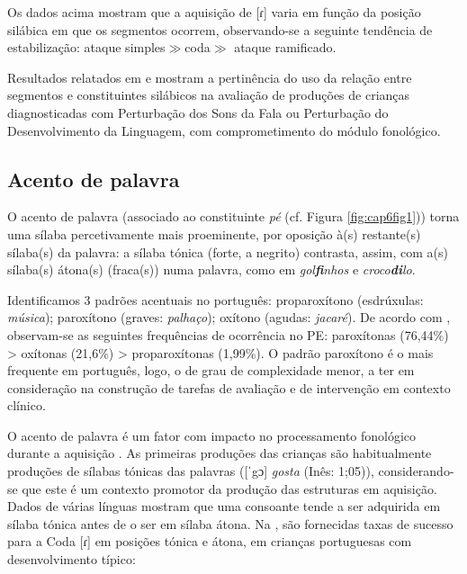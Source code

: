 \documentclass[output=paper,colorlinks,citecolor=brown,booklanguage=portuguese]{langscibook}
\begin{document}
Os dados acima mostram que a aquisição de [ɾ] varia em função da posição silábica em que os segmentos ocorrem, observando-se a seguinte tendência de estabilização: ataque simples$\gg$coda$\gg$ ataque ramificado.

Resultados relatados em \citet{Lousada2012a} e \citet{Ramalho2017a} mostram a pertinência do uso da relação entre segmentos e constituintes silábicos na avaliação de produções de crianças diagnosticadas com Perturbação dos Sons da Fala ou Perturbação do Desenvolvimento da Linguagem, com comprometimento do módulo fonológico.

\subsection{Acento de palavra}
O acento de palavra (associado ao constituinte \emph{pé} (cf. Figura \ref{fig:cap6fig1})) torna uma sílaba percetivamente mais proeminente, por oposição à(s) restante(s) sílaba(s) da palavra: a sílaba tónica (forte, a negrito) contrasta, assim, com a(s) sílaba(s) átona(s) (fraca(s)) numa palavra, como em \emph{gol\textbf{fi}nhos} e \emph{croco\textbf{di}lo}.

Identificamos 3 padrões acentuais no português: proparoxítono (esdrúxulas: \emph{música}); paroxítono (graves: \emph{palhaço}); oxítono (agudas: \emph{jacaré}). De acordo com \citet{Vigario2006}, obser\-vam-se as seguintes frequências de ocorrência no PE: paroxítonas (76,44\%) > oxítonas (21,6\%) > proparoxítonas (1,99\%). O padrão paroxítono é o mais frequente em português, logo, o de grau de complexidade menor, a ter em consideração na construção de tarefas de avaliação e de intervenção em contexto clínico.

O acento de palavra é um fator com impacto no processamento fonológico durante a aquisição \citep{Bernhardt2000}. As primeiras produções das crianças são habitualmente produções de sílabas tónicas das palavras ([ˈgɔ] \emph{gosta} (Inês: 1;05)), considerando-se que este é um contexto promotor da produção das estruturas em aquisição. Dados de várias línguas mostram que uma consoante tende a ser adquirida em sílaba tónica antes de o ser em sílaba átona. Na , são fornecidas taxas de sucesso para a Coda [ɾ] em posições tónica e átona, em crianças portuguesas com desenvolvimento típico:
\end{document}

